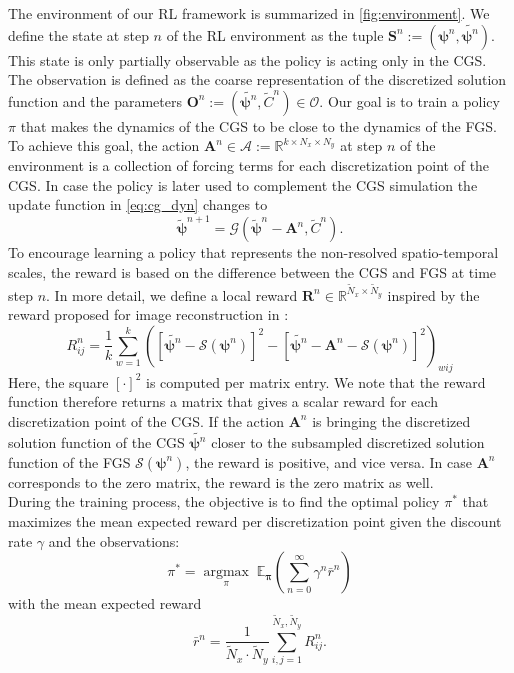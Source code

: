 \documentclass{article}
\theoremstyle{plain}
\theoremstyle{definition}
\theoremstyle{remark}
\begin{document}
The environment of our RL framework is summarized in \cref{fig:environment}. We define the state at step $n$ of the RL environment as the tuple $\boldsymbol{S}^n := (\boldsymbol{\psi}^n, \tilde{ \boldsymbol{\psi}^n})$. This state is only partially observable as the policy is acting only in the CGS. The observation is defined as the coarse representation of the discretized solution function and the parameters $\boldsymbol{O}^n:=(\tilde{ \boldsymbol{\psi}^n}, \tilde C^n) \in \mathcal O$. Our goal is to train a policy $\pi$ that makes the dynamics of the CGS to be close to the dynamics of  the FGS. To achieve this goal, the action ${\boldsymbol{ A}^n} \in \mathcal A :=  \mathbb{R}^{k \times N_x \times N_y }$ at step $n$ of the environment is a collection of forcing terms for each discretization point of the CGS. In case the policy is later used to complement the CGS simulation the update function in \cref{eq:cg_dyn} changes to 
\begin{equation}
   \tilde{\boldsymbol{\psi}}^{n+1}=\mathcal G(\tilde{\boldsymbol{ \psi}}^n - {\boldsymbol{ A}^n}, \tilde C^n). 
\end{equation}
To encourage learning a policy that represents the non-resolved spatio-temporal scales, the reward is based on the difference between the CGS and FGS at time step $n$. In more detail, we define a local reward $\boldsymbol{R}^n \in \mathbb R^{\tilde N_x\times \tilde N_y}$ inspired by the reward proposed for image reconstruction in \cite{cv_pixel_rl}:
\begin{equation}
R_{ij}^n = \frac{1}{k} \sum_{w=1}^k \left([\tilde{\boldsymbol{ \psi}^n} - \mathcal S(\boldsymbol{\psi}^n)]^2 - [\tilde{\boldsymbol{ \psi}^{n}} - {\boldsymbol{ A}^n} - \mathcal S(\boldsymbol{\psi}^n)]^2 \right)_{wij}
\end{equation}
Here, the square $[\cdot]^2$ is computed per matrix entry. We note that the reward function therefore returns a matrix that gives a scalar reward for each discretization point of the CGS.
If the action $\boldsymbol{A}^n$ is bringing the discretized solution function of the CGS $\tilde{\boldsymbol{ \psi}^n}$ closer to the subsampled discretized solution function of the FGS $\mathcal{S}(\boldsymbol{ \psi}^n)$, the reward is positive, and vice versa. In case $\boldsymbol{A}^n$ corresponds to the zero matrix, the reward is the zero matrix as well.\\
During the training process, the objective is to find the optimal policy $\pi^*$ that maximizes the mean expected reward per discretization point given the discount rate $\gamma$ and the observations:
\begin{equation}
\label{eq:pol_old}
\pi^*  =\underset{\pi}{\operatorname{argmax }}\; \mathbb E_{\boldsymbol{\pi}}\left(\sum_{n=0}^{\infty} \gamma^n \bar{r}^{n}\right)
\end{equation}
with the mean expected reward
\begin{equation}
\bar{r}^{n}  =\frac{1}{\tilde N_x\cdot \tilde N_y} \sum_{i,j=1}^{\tilde N_x, \tilde N_y}  R_{ij}^{n}.
\end{equation}
\end{document}
